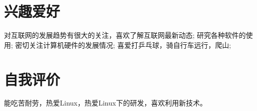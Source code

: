 \documentclass[a4paper]{moderncvwutao}
\begin{document}
\begin{CJK*}{UTF8}{gbsn}
\section{兴趣爱好}
\cvitem{}
{
	\small 对互联网的发展趋势有很大的关注，喜欢了解互联网最新动态;
	研究各种软件的使用;
	密切关注计算机硬件的发展情况;
	喜爱打乒乓球，骑自行车远行，爬山;
}
\section{自我评价}
\cvitem{}{}
{
	能吃苦耐劳，热爱Linux，热爱Linux下的研发，喜欢利用新技术。
}
\closesection
\end{CJK*}
\end{document}
